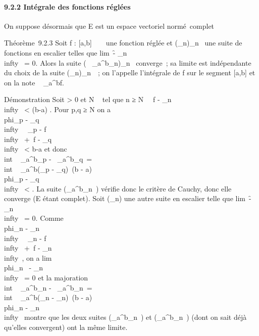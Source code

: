 \documentclass[]{article}
\begin{document}
\paragraph{9.2.2 Intégrale des fonctions réglées}

On suppose désormais que E est un espace vectoriel normé~complet

Théorème~9.2.3 Soit f : [a,b] \rightarrow~ ~ une fonction réglée et
(\phi_n)_n\in{}~ une suite de fonctions en escalier telles
que lim~\f -
\phi_n\\infty~ = 0. Alors la suite
\left (\int ~
_a^b\phi_n\right )_n\in{}~
converge~; sa limite est indépendante du choix de la suite
(\phi_n)_n\in{}~~; on l'appelle l'intégrale de f sur le
segment [a,b] et on la note \int ~
_a^bf.

Démonstration Soit \epsilon > 0 et N \in {}~ tel que n ≥ N
\rigtharrow~\ f - \phi_n\\infty~
< \epsilon {}(b-a) . Pour p,q ≥ N on a
\\phi_p -
\phi_q\\infty~ \leq\
\phi_p - f\\infty~ +\
f - \phi_q\\infty~ < \epsilon
\over b-a et donc
\\int ~
_a^b\phi_p -\int ~
_a^b\phi_q\
=\\int ~
_a^b(\phi_p -
\phi_q)\ \leq (b -
a)\\phi_p -
\phi_q\\infty~ < \epsilon. La suite
(\int  _a^b\phi_n~) vérifie
donc le critère de Cauchy, donc elle converge (E étant complet). Soit
(\psi_n) une autre suite en escalier telle que
lim~\f -
\psi_n\\infty~ = 0. Comme
\\phi_n -
\psi_n\\infty~ \leq\
\phi_n - f\\infty~ +\
f - \psi_n\\infty~, on a
lim\\phi_n~ -
\psi_n\\infty~ = 0 et la majoration
\\int ~
_a^b\phi_n -\int ~
_a^b\psi_n\
=\\int ~
_a^b(\phi_n -
\psi_n)\ \leq (b -
a)\\phi_n -
\psi_n\\infty~ montre que les deux suites
(\int  _a^b\phi_n~) et
(\int  _a^b\psi_n~) (dont on
sait déjà qu'elles convergent) ont la même limite.
\end{document}
